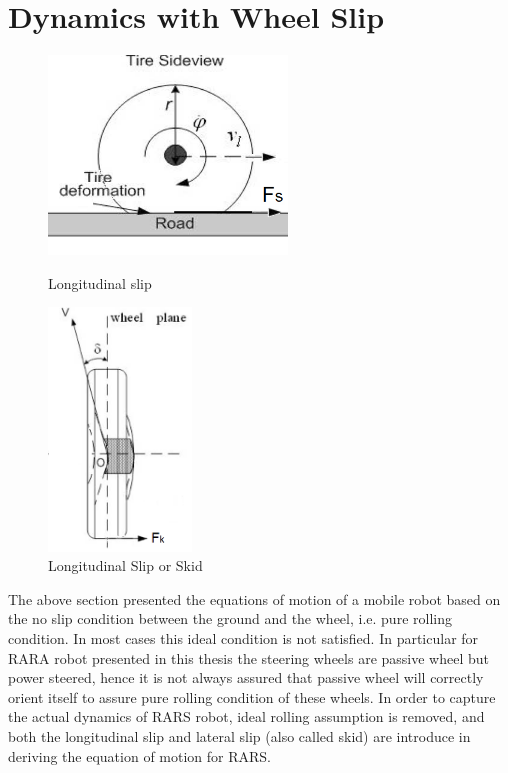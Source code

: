 {\section{Dynamics with Wheel Slip}
\label{sec:SlipDlast sectionynamics}
\begin{figure}
	\caption{}
	\begin{minipage}[t]{0.5\textwidth}
		\centering
		\includegraphics[width=2.5in]{Chapter3/fig/Slip} 
		\caption{Longitudinal slip}\label{fig:slip}
	\end{minipage}
	\hfill
	\begin{minipage}[t]{0.5\textwidth}
		\centering
		\includegraphics[width=1.5in]{Chapter3/fig/Skid} 
		\caption{Longitudinal Slip or Skid}\label{fig:skid}
	\end{minipage}
\end{figure}
The above section presented  the equations of motion  of a mobile robot  based on the no slip condition between the ground and the wheel, i.e. pure rolling condition. In most cases this ideal condition is not satisfied. In particular for RARA robot presented in this thesis the steering wheels  are passive wheel but power steered, hence it is not always  assured that passive wheel will correctly orient itself to assure pure rolling condition of these wheels. In order to capture the actual dynamics of RARS robot, ideal rolling assumption  is  removed, and both the longitudinal slip and lateral slip (also called skid) are introduce in deriving the equation of motion for RARS.
}
